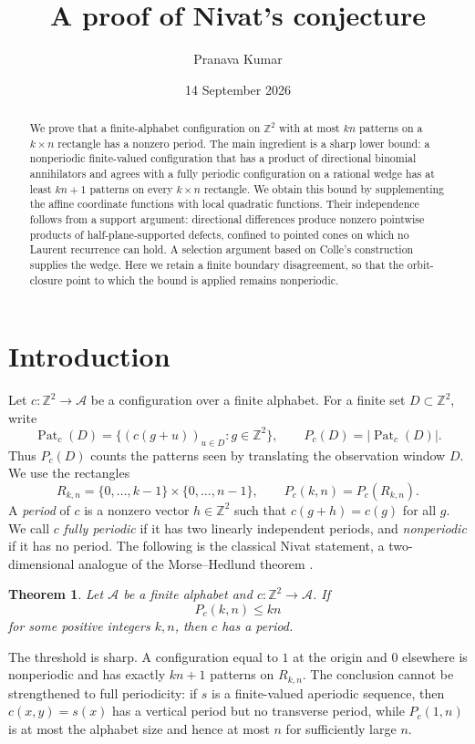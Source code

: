 \documentclass[11pt]{article}
\title{A proof of Nivat's conjecture}
\author{Pranava Kumar}
\date{14 September 2026}
\numberwithin{equation}{section}
\newtheorem{theorem}{Theorem}[section]
\theoremstyle{definition}
\theoremstyle{remark}
\newcommand{\Z}{\mathbb Z}
\newcommand{\Pat}{\operatorname{Pat}}
\newcommand{\Rect}{R_{k,n}}
\begin{document}
\maketitle
\begin{abstract}
We prove that a finite-alphabet configuration on $\Z^2$ with at most $kn$ patterns on a $k\times n$
rectangle has a nonzero period. The main ingredient is a sharp lower bound: a nonperiodic
finite-valued configuration that has a product of directional binomial annihilators and agrees with a
fully periodic configuration on a rational wedge has at least $kn+1$ patterns on every $k\times n$
rectangle. We obtain this bound by supplementing
the affine coordinate functions with local quadratic functions. Their independence follows from a
support argument: directional differences produce nonzero pointwise products of half-plane-supported defects,
confined to pointed cones on which no Laurent recurrence can hold. A selection argument based on
Colle's construction supplies the wedge. Here we retain a finite boundary disagreement, so that the
orbit-closure point to which the bound is applied remains nonperiodic.
\end{abstract}

\section{Introduction}
Let $c:\Z^2\to\mathcal A$ be a configuration over a finite alphabet. For a finite set $D\subset\Z^2$, write
\[
 \Pat_c(D)=\{(c(g+u))_{u\in D}:g\in\Z^2\},\qquad P_c(D)=|\Pat_c(D)|.
\]
Thus $P_c(D)$ counts the patterns seen by translating the observation window $D$. We use the rectangles
\[
 \Rect=\{0,\ldots,k-1\}\times\{0,\ldots,n-1\},\qquad
 P_c(k,n)=P_c(\Rect).
\]
A \emph{period} of $c$ is a nonzero vector $h\in\Z^2$ such that $c(g+h)=c(g)$ for all $g$. We call
$c$ \emph{fully periodic} if it has two linearly independent periods, and \emph{nonperiodic} if it
has no period. The following is the classical Nivat statement, a two-dimensional analogue of the Morse--Hedlund theorem \cite{MH}.

\begin{theorem}\label{thm:nivat}
Let $\mathcal A$ be a finite alphabet and $c:\Z^2\to\mathcal A$. If
\[
 P_c(k,n)\le kn
\]
for some positive integers $k,n$, then $c$ has a period.
\end{theorem}

The threshold is sharp. A configuration equal to $1$ at the origin and $0$ elsewhere is nonperiodic
and has exactly $kn+1$ patterns on $\Rect$. The conclusion cannot be strengthened to full
periodicity: if $s$ is a finite-valued aperiodic sequence, then $c(x,y)=s(x)$ has a vertical period
but no transverse period, while $P_c(1,n)$ is at most the alphabet size and hence at most $n$ for
sufficiently large $n$.
\end{document}
